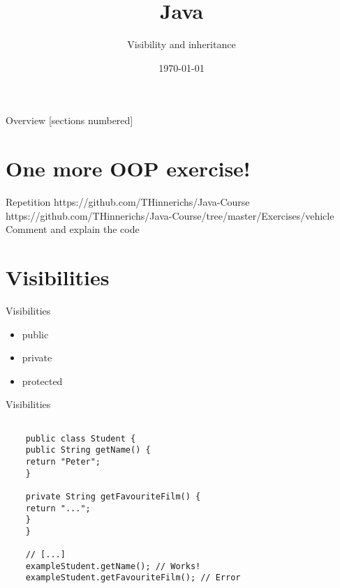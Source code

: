 

\usepackage{verbatim}

\title{Java}
\subtitle{Visibility and inheritance}
\date{\today}


	

\begin{frame}
	\titlepage
\end{frame}
\begin{frame}{Overview}
	[sections numbered]
	\tableofcontents
\end{frame}

\section{One more OOP exercise!}
\begin{frame}[fragile]{Repetition}	
	https://github.com/THinnerichs/Java-Course
	https://github.com/THinnerichs/Java-Course/tree/master/Exercises/vehicle
	\huge Comment and explain the code
\end{frame}

\section{Visibilities}
\begin{frame}[fragile]{Visibilities}
	\begin{itemize}
		\item public
		\item private
		\item protected
	\end{itemize}
\end{frame}

\begin{frame}[fragile]{Visibilities}
	
	\begin{lstlisting}
	
	public class Student {
	public String getName() {
	return "Peter";
	}
	
	private String getFavouriteFilm() {
	return "...";
	}
	}
	
	// [...]
	exampleStudent.getName(); // Works!
	exampleStudent.getFavouriteFilm(); // Error
	
	\end{lstlisting}
	
\end{frame}

